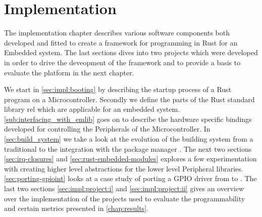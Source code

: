 \chapter{Implementation}
\label{chap:impl}

The implementation chapter describes various software components both developed and fitted to create a framework for programming in Rust for an Embedded system.
The last sections dives into two projects which were developed in order to drive the deveopment of the framework and to provide a basis to evaluate the platform in the next chapter.

We start in \autoref{sec:impl:booting} by describing the startup process of a Rust program on a Microcontroller.
Secondly we define the parts of the Rust standard library \gls{rel} which are applicable for an embedded system.
\autoref{sub:interfacing_with_emlib} goes on to describe the hardware specific bindings developed for controlling the Peripherals of the Microcontroller.
In \autoref{sec:build_system} we take a look at the evolution of the building system from a traditional  to the integration with the {\rust} package manager {\cargo}.
The next two sections \autoref{sec:irq-closures} and \autoref{sec:rust-embedded-modules} explores a few experimentation with creating higher level abstractions for the lower level Peripheral libraries.
\autoref{sec:porting-gpioint} looks at a case study of porting a GPIO driver from {\C} to {\rust}.
The last two sections \autoref{sec:impl:project:i} and \autoref{sec:impl:project:ii} gives an overview over the implementation of the projects used to evaluate the programmability and certain metrics presented in \autoref{chap:results}.











